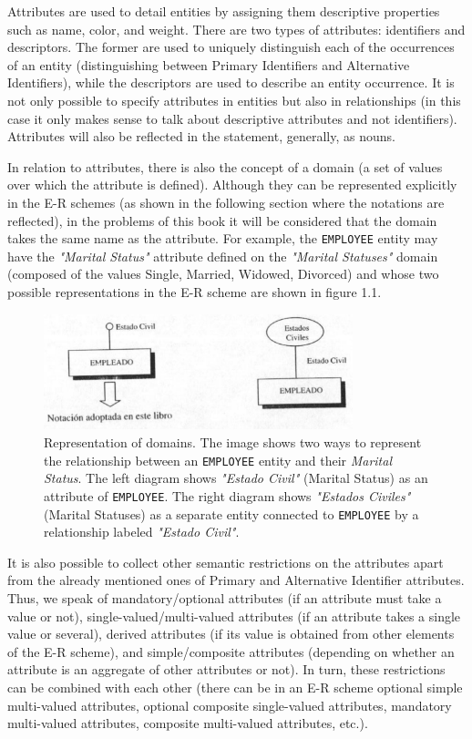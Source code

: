 \documentclass{article}
\begin{document}
Attributes are used to detail entities by assigning them descriptive properties such as name, color, and weight.  There are two types of attributes: identifiers and descriptors.  The former are used to uniquely distinguish each of the occurrences of an entity (distinguishing between Primary Identifiers and Alternative Identifiers), while the descriptors are used to describe an entity occurrence.  It is not only possible to specify attributes in entities but also in relationships (in this case it only makes sense to talk about descriptive attributes and not identifiers).  Attributes will also be reflected in the statement, generally, as nouns.

In relation to attributes, there is also the concept of a domain (a set of values over which the attribute is defined).  Although they can be represented explicitly in the E-R schemes (as shown in the following section where the notations are reflected), in the problems of this book it will be considered that the domain takes the same name as the attribute.  For example, the \texttt{EMPLOYEE} entity may have the \textit{"Marital Status"} attribute defined on the \textit{"Marital Statuses"} domain (composed of the values Single, Married, Widowed, Divorced) and whose two possible representations in the E-R scheme are shown in figure 1.1.

\begin{figure}
    \centering
    \includegraphics[width=0.8\textwidth]{figures/fig1}
    \caption{Representation of domains. The image shows two ways to represent the relationship between an \texttt{EMPLOYEE} entity and their \textit{Marital Status}. The left diagram shows \textit{"Estado Civil"} (Marital Status) as an attribute of \texttt{EMPLOYEE}. The right diagram shows \textit{"Estados Civiles"} (Marital Statuses) as a separate entity connected to \texttt{EMPLOYEE} by a relationship labeled \textit{"Estado Civil"}.}
    \label{fig:fig1.1}
\end{figure}

It is also possible to collect other semantic restrictions on the attributes apart from the already mentioned ones of Primary and Alternative Identifier attributes.  Thus, we speak of mandatory/optional attributes (if an attribute must take a value or not), single-valued/multi-valued attributes (if an attribute takes a single value or several), derived attributes (if its value is obtained from other elements of the E-R scheme), and simple/composite attributes (depending on whether an attribute is an aggregate of other attributes or not).  In turn, these restrictions can be combined with each other (there can be in an E-R scheme optional simple multi-valued attributes, optional composite single-valued attributes, mandatory multi-valued attributes, composite multi-valued attributes, etc.).
\end{document}
